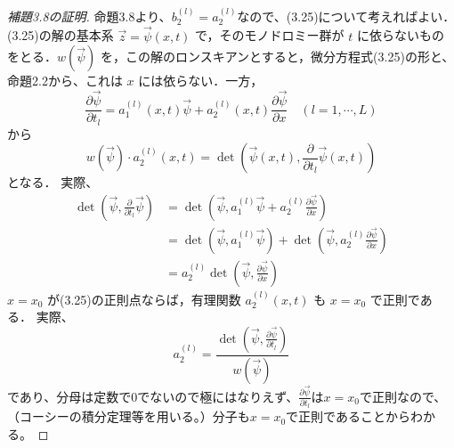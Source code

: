 \documentclass[paper=a4, fontsize=11pt]{jlreq} %
\newenvironment{story}{%
  \begin{mdframed}[
    backgroundcolor=red!5, %
    linewidth=0pt,         %
    innertopmargin=10pt,   %
    innerbottommargin=10pt,
    innerrightmargin=10pt, %
    innerleftmargin=10pt
  ]%
}{%
  \end{mdframed}%
}
\theoremstyle{break}
\theoremstyle{qa}
\begin{document}
\begin{story}
\begin{proof}[補題3.8の証明]
命題3.8より、$b_{2}^{(l)}=a_{2}^{(l)}$なので、(3.25)について考えればよい．(3.25)の解の基本系 $\vec{z} = \vec{\psi}(x,t)$ で，そのモノドロミー群が $t$ に依らないものをとる．$w(\vec{\psi})$ を，この解のロンスキアンとすると，微分方程式(3.25)の形と、命題2.2から、これは $x$ には依らない．一方，
\[
\frac{\partial \vec{\psi}}{\partial t_{l}} = a_{1}^{(l)}(x,t)\vec{\psi}+a_{2}^{(l)}(x,t)\frac{\partial\vec{\psi}}{\partial x} \quad (l=1,\cdots,L)
\]
から
\begin{equation}
    w(\vec{\psi}) \cdot a_2^{(l)}(x,t) = \det \left( \vec{\psi}(x,t), \frac{\partial}{\partial t_l}\vec{\psi}(x,t) \right) \label{eq:3.90}
\end{equation}
となる．
実際、
\begin{align*}
\det \left( \vec{\psi}, \frac{\partial}{\partial t_l}\vec{\psi}\right)&=\det \left( \vec{\psi}, a_{1}^{(l)}\vec{\psi}+a_{2}^{(l)}\frac{\partial\vec{\psi}}{\partial x}\right)\\
&=\det \left( \vec{\psi}, a_{1}^{(l)}\vec{\psi} \right)+\det \left(\vec{\psi}, a_{2}^{(l)}\frac{\partial\vec{\psi}}{\partial x}\right)\\
&=a_{2}^{(l)}\det \left(\vec{\psi}, \frac{\partial\vec{\psi}}{\partial x}\right)
\end{align*}
$x=x_0$ が(3.25)の正則点ならば，有理関数 $a_2^{(l)}(x,t)$ も $x=x_0$ で正則である．
実際、
\[
a_{2}^{(l)}=\frac{\det \left( \vec{\psi}, \frac{\partial\vec{\psi}}{\partial t_l}\right)}{w(\vec{\psi})}
\]
であり、分母は定数で0でないので極にはなりえず、$\frac{\partial\vec{\psi}}{\partial t_l}$は$x=x_{0}$で正則なので、（コーシーの積分定理等を用いる。）分子も$x=x_{0}$で正則であることからわかる。


\end{proof}
\end{story}
\end{document}

